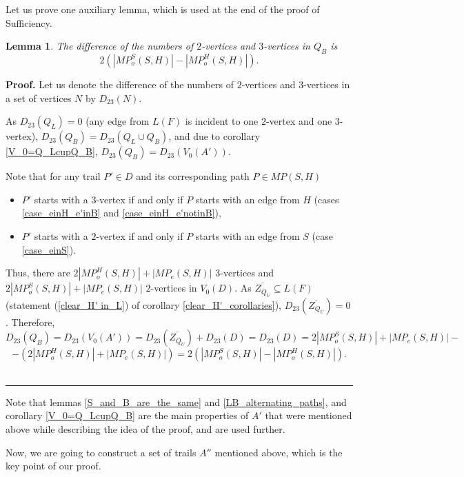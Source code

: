 \documentclass[a4paper, 12pt]{article}
\newtheorem{lemma}{Lemma}[subsection]
\newenvironment{proof}[1][Proof]{\noindent\textbf{#1.} }{\ \rule{0.5em}{0.5em}}
\begin{document}
Let us prove one auxiliary lemma, which is used at the end of the
proof of Sufficiency.
\begin{lemma}\label{2-3}
The difference of the numbers of $2$-vertices and $3$-vertices in
$Q_B$ is $$2(|MP_o^S(S,H)| - |MP_o^H(S,H)|).$$
\end{lemma}
\begin{proof}
Let us denote the difference of the numbers of $2$-vertices and
$3$-vertices in a set of vertices $N$ by $D_{23}(N)$.

As $D_{23}(Q_L) = 0$ (any edge from $L(F)$ is incident to one
$2$-vertex and one $3$-vertex), $D_{23}(Q_B) = D_{23}(Q_L \cup
Q_B)$, and due to corollary \ref{V_0=Q_LcupQ_B}, $D_{23}(Q_B) =
D_{23}(V_0(A'))$.

Note that for any trail $P' \in D$ and its corresponding path $P \in
MP(S,H)$
\begin{itemize}
\item $P'$ starts with a $3$-vertex if and only if $P$ starts
with an edge from $H$ (cases \ref{case_einH_e'inB} and
\ref{case_einH_e'notinB}),
\item $P'$ starts with a $2$-vertex if and only if $P$ starts
with an edge from $S$ (case \ref{case_einS}).
\end{itemize}
Thus, there are $2|MP_o^H(S,H)| + |MP_e(S,H)|$ $3$-vertices and
$2|MP_o^S(S,H)| + |MP_e(S,H)|$ $2$-vertices in $V_0(D)$. As
$\overline{Z_{Q_U}} \subseteq L(F)$ (statement (\ref{clear_H' in_L})
of corollary \ref{clear_H'_corollaries}),
$D_{23}(\overline{Z_{Q_U}}) = 0$. Therefore,
$$D_{23}(Q_B) = D_{23}(V_0(A')) = D_{23}(\overline{Z_{Q_U}}) + D_{23}(D) = D_{23}(D) = 2|MP_o^S(S,H)| + |MP_e(S,H)| -$$
$$- (2|MP_o^H(S,H)| + |MP_e(S,H)|) = 2(|MP_o^S(S,H)| -
|MP_o^H(S,H)|).$$
\end{proof}

\bigskip

Note that lemmas \ref{S_and_B_are_the_same} and
\ref{LB_alternating_paths}, and corollary \ref{V_0=Q_LcupQ_B} are
the main properties of $A'$ that were mentioned above while
describing the idea of the proof, and are used further.

\bigskip

Now, we are going to construct a set of trails $A''$ mentioned
above, which is the key point of our proof.
\end{document}
